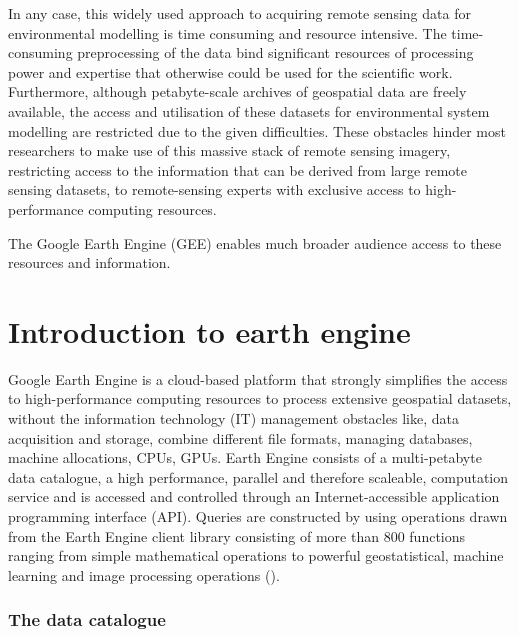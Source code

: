 \documentclass[12pt,twoside,a4paper,final]{report}
\begin{document}
In any case, this widely used approach to acquiring remote sensing data for environmental modelling is time consuming and resource intensive.
The time-consuming preprocessing of the data bind significant resources of processing power and expertise that otherwise could be used for the scientific work. Furthermore, although petabyte-scale archives of geospatial data are freely available, the access and utilisation of these datasets for environmental system modelling are restricted due to the given difficulties. 
These obstacles hinder most researchers to make use of this massive stack of remote sensing imagery, restricting access to the information that can be derived from large remote sensing datasets, to remote-sensing experts with exclusive access to high-performance computing resources.

The Google Earth Engine (GEE) enables much broader audience access to these resources and information.

\section{Introduction to earth engine}

Google Earth Engine is a cloud-based platform that strongly simplifies the access to high-performance computing resources to process extensive geospatial datasets, without the information technology (IT) management obstacles like, data acquisition and storage, combine different file formats, managing databases, machine allocations, CPUs, GPUs. 
Earth Engine consists of a multi-petabyte data catalogue, a high performance, parallel and therefore scaleable, computation service and is accessed and controlled through an Internet-accessible application programming interface (API).  Queries are constructed by using operations drawn from the Earth Engine client library consisting of more than 800 functions ranging from simple mathematical operations to powerful geostatistical, machine learning and image processing operations (\cite{gorelick2017google}).

\subsubsection{The data catalogue}
\end{document}
